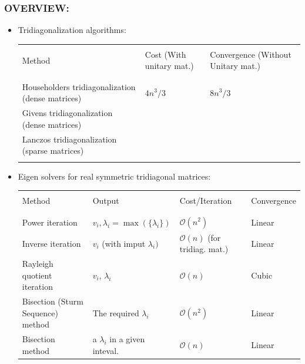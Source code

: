 \documentclass[a4paper,8pt]{beamer} %
\begin{document}
\begin{frame} %
\frametitle{OVERVIEW:}
		\begin{itemize}
			\item Tridiagonalization algorithms:
				\begin{table}
					\begin{Tiny}
						\centering
						\begin{tabular}{lll}
							\hline
							\hline
							\\
							Method & Cost (With unitary mat.) & Convergence (Without Unitary mat.) \\
							\\
							\hline
							\\
							Householders tridiagonalization (dense matrices) 	& $4n^3/3 $ & $ 8n^3/3 $ \\
							Givens tridiagonalization (dense matrices)			& %
							 &  \\
							Lanczos tridiagonalization (sparse matrices)		& & \\
							\\
							\hline
							\hline
						\end{tabular}
					\end{Tiny}
				\end{table}
			\item Eigen solvers for real symmetric tridiagonal matrices:
				\begin{table}
					\begin{Tiny}
						\centering
						\begin{tabular}{llll}
							\hline
							\hline
							\\
							Method & Output & Cost/Iteration & Convergence \\
							\\
							\hline
							\\
							Power iteration 			& $v_i, \lambda_{i}=\max{(\{\lambda_i\})}$ & $\mathcal O(n^{2})$& Linear\\ 
							Inverse iteration 			& $v_i$ (with imput $\lambda_{i})$ & $\mathcal O(n)$ (for tridiag. mat.) & Linear\\ 
							Rayleigh quotient iteration & $v_i$, $\lambda_{i}$ & $\mathcal O(n)$ &	Cubic \\
							Bisection (Sturm Sequence) method 	& The required $\lambda_i$ 	& $\mathcal O(n^2)$ & Linear \\
							Bisection method 		& a $\lambda_i$ in a given inteval.	& $\mathcal O(n)$ & Linear \\

\end{tabular}
\end{Tiny}
\end{table}
\end{itemize}
\end{frame}
\end{document}
